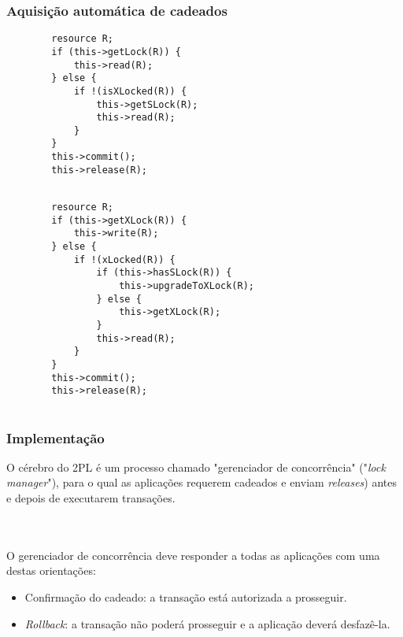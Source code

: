 \documentclass{beamer}
\begin{document}

\begin{frame}[fragile] %
    \frametitle{Aquisição automática de cadeados}
    \begin{example}
    \begin{verbatim}
        resource R;
        if (this->getLock(R)) {
            this->read(R);
        } else {
            if !(isXLocked(R)) {
                this->getSLock(R);
                this->read(R);
            }
        }
        this->commit();
        this->release(R);
    
    \end{verbatim}
    \end{example}
\end{frame}


\begin{frame}[fragile] %
    \begin{example}
    \begin{verbatim}
        resource R;
        if (this->getXLock(R)) {
            this->write(R);
        } else {
            if !(xLocked(R)) {
                if (this->hasSLock(R)) {
                    this->upgradeToXLock(R);
                } else {
                    this->getXLock(R);
                }
                this->read(R);
            }
        }
        this->commit();
        this->release(R);
    
    \end{verbatim}
    \end{example}
\end{frame}


\begin{frame}
    \frametitle{Implementação}

    O cérebro do 2PL é um processo chamado "gerenciador de concorrência" ("\emph{lock manager}"), para o qual as aplicações requerem cadeados e enviam \emph{releases}) antes e depois de executarem transações.

    \\~\\
    O gerenciador de concorrência deve responder a todas as aplicações com uma destas orientações:

    \begin{itemize}
        \item Confirmação do cadeado: a transação está autorizada a prosseguir.
        \item \emph{Rollback}: a transação não poderá prosseguir e a aplicação deverá desfazê-la.
    \end{itemize}
\end{frame}
\end{document}
